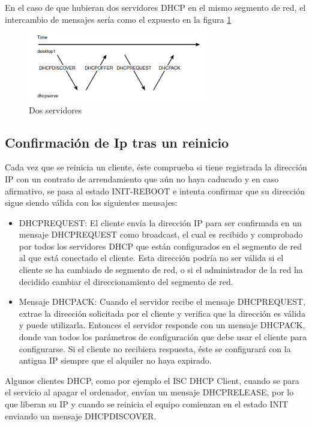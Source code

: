 En el caso de que hubieran dos servidores DHCP en el mismo segmento de red, el intercambio de mensajes sería como el expuesto en la figura \ref{fig:3}

\begin{figure}
  \centering
    \includegraphics[width=0.7\textwidth]{img/com}
  \caption{Dos servidores}
  \label{fig:3}
\end{figure}

\subsection{Confirmación de Ip tras un reinicio}

Cada vez que se reinicia un cliente, éste comprueba si tiene registrada la dirección IP con un contrato de arrendamiento que aún no haya caducado y en caso afirmativo, se pasa al estado INIT-REBOOT e intenta confirmar que su dirección sigue siendo válida con los siguientes mensajes:
	
	\begin{itemize}
		\item DHCPREQUEST: El cliente envía la dirección IP para ser confirmada en un mensaje DHCPREQUEST como broadcast, el cual es recibido y comprobado por todos los servidores DHCP que están configurados en el segmento de red al que está conectado el cliente. Esta dirección podría no ser válida si el cliente se ha cambiado de segmento de red, o si el administrador de la red ha decidido cambiar el direccionamiento del segmento de red.
		\item Mensaje DHCPACK: Cuando el servidor recibe el mensaje DHCPREQUEST, extrae la dirección solicitada por el cliente y verifica que la dirección es válida y puede utilizarla. Entonces el servidor responde con un mensaje DHCPACK, donde van todos los parámetros de configuración que debe usar el cliente para configurarse. Si el cliente no recibiera respuesta, éste se configurará con la antigua IP siempre que el alquiler no haya expirado.
	\end{itemize}

Algunos clientes DHCP, como por ejemplo el ISC DHCP Client, cuando se para el servicio al apagar el ordenador, envían un mensaje DHCPRELEASE, por lo que liberan su IP y cuando se reinicia el equipo comienzan en el estado INIT enviando un mensaje DHCPDISCOVER.


